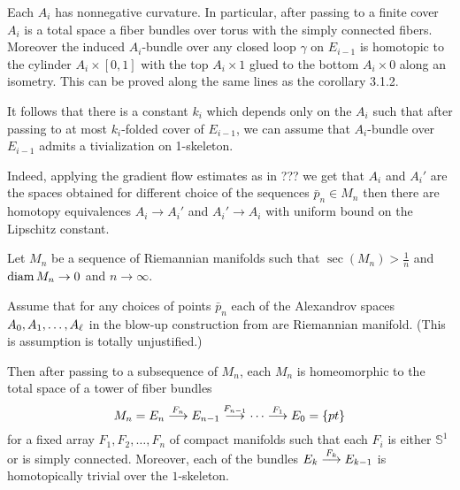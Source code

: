 \documentclass{amsart}
\begin{document}
Each $A_i$ has nonnegative curvature.
In particular, after passing to a finite cover $A_i$ is a total space a fiber bundles over torus with the simply connected fibers.
Moreover the induced $A_i$-bundle over any closed loop $\gamma$ on $E_{i-1}$ is homotopic to the cylinder  $A_i\times[0,1]$ with the top $A_i\times 1$ glued to the bottom $A_i\times 0$ along an isometry.
This can be proved along the same lines as the corollary 3.1.2. 

It follows that there is a constant $k_i$ which depends only on the $A_i$ such that  
after passing to at most $k_i$-folded  cover of $E_{i-1}$, we can assume that $A_i$-bundle over $E_{i-1}$ admits a tivialization on 1-skeleton.

Indeed, applying the gradient flow estimates as in ??? we get that $A_i$ and $A_i'$
are the spaces obtained for different choice of the sequences $\bar p_n\in M_n$
then there are homotopy equivalences $A_i\to A_i'$ and $A_i'\to A_i$ with uniform bound on the Lipschitz constant.


\begin{thm}
Let $M_n$ be a sequence of Riemannian manifolds such that $\sec(M_n)>\tfrac1n$ and $\operatorname{\rm diam} M_n\to 0$ and $n\to\infty$.

Assume that for any choices of points $\bar p_n$ each of the Alexandrov spaces $A_0,A_1,\z\dots,A_\ell$ in the blow-up construction from \cite[Subsection 4.3]{KPT} are Riemannian manifold.
(This is assumption is totally unjustified.)

Then after passing to a subsequence of $M_n$,
each $M_n$ is homeomorphic to the total space of a tower of fiber bundles
$$M_n=E_n\buildrel {F_n}\over \longrightarrow E_{n-1}\buildrel {F_{n-1}}\over\longrightarrow\dots\buildrel {F_1}\over\longrightarrow E_0=\{pt\}$$
for a fixed array $F_1,F_2,\dots,F_n$  of compact manifolds 
such that each $F_i$ is either $\mathbb{S}^{1}$ or is simply connected.
Moreover, each of the bundles $E_k\buildrel {F_k}\over \longrightarrow E_{k-1}$ is homotopically trivial over the $1$-skeleton.  
\end{thm}
\end{document}
